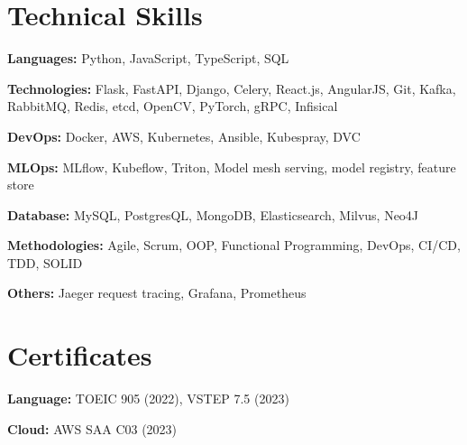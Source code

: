 \documentclass[letterpaper,11pt]{article}
\begin{document}
\section{Technical Skills}
 \begin{itemize}[leftmargin=0.15in, label={}]
    \small{\item{
     \textbf{Languages:}{ Python, JavaScript, TypeScript, SQL} \\ \vspace{3pt}

        \textbf{Technologies:}{ Flask, FastAPI, Django, Celery, React.js, AngularJS, Git, Kafka, RabbitMQ, Redis, etcd, OpenCV, PyTorch, gRPC, Infisical} \\ \vspace{3pt}

        \textbf{DevOps:}{ Docker, AWS, Kubernetes, Ansible, Kubespray, DVC} \\ \vspace{3pt}

        \textbf{MLOps:}{ MLflow, Kubeflow, Triton, Model mesh serving, model registry, feature store} \\  \vspace{3pt}

        \textbf{Database:}{  MySQL, PostgresQL, MongoDB, Elasticsearch, Milvus, Neo4J} \\ \vspace{3pt}

        \textbf{Methodologies:}{ Agile, Scrum, OOP, Functional Programming, DevOps, CI/CD, TDD, SOLID} \\ \vspace{3pt}

	\textbf{Others: }{Jaeger request tracing, Grafana, Prometheus} \\ \vspace{3pt}
    }}
 \end{itemize}

\section{Certificates}
 \begin{itemize}[leftmargin=0.15in, label={}]
    \small{\item{
     \textbf{Language:}{ TOEIC 905 (2022), VSTEP 7.5 (2023)} \\ \vspace{3pt}

        \textbf{Cloud:}{ AWS SAA C03 (2023)} \\ \vspace{3pt}

    }}
 \end{itemize}



\end{document}
